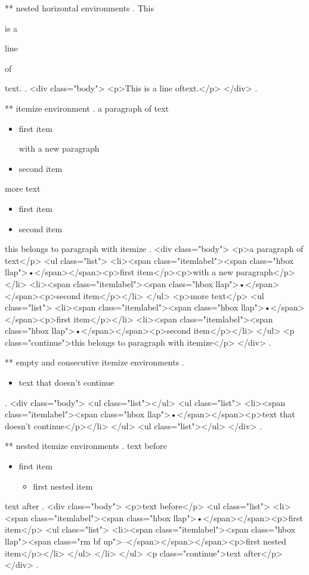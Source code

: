 ** nested horizontal environments
.
This \begin{empty}is a \begin{empty}line\end{empty} of\end{empty} text.
.
<div class="body">
<p>This is a line​ of​ text.</p>
</div>
.



** itemize environment
.
a paragraph of text

\begin{itemize}
    \item first item

        with a new paragraph
    \item second item
\end{itemize}
%

more text

\begin{itemize}
    \item first item
    \item second item

\end{itemize}
this belongs to paragraph with itemize
.
<div class="body">
<p>a paragraph of text</p>
<ul class="list">
<li><span class="itemlabel"><span class="hbox llap">•</span></span><p>ﬁrst item</p><p>with a new paragraph</p></li>
<li><span class="itemlabel"><span class="hbox llap">•</span></span><p>second item</p></li>
</ul>
<p>more text</p>
<ul class="list">
<li><span class="itemlabel"><span class="hbox llap">•</span></span><p>ﬁrst item</p></li>
<li><span class="itemlabel"><span class="hbox llap">•</span></span><p>second item</p></li>
</ul>
<p class="continue">this belongs to paragraph with itemize</p>
</div>
.


** empty and consecutive itemize environments
.
\begin{itemize}

\end{itemize}
\begin{itemize}
    \item text that doesn't continue
\end{itemize}
\begin{itemize}
\end{itemize}
.
<div class="body">
<ul class="list"></ul>
<ul class="list">
<li><span class="itemlabel"><span class="hbox llap">•</span></span><p>text that doesn’t continue</p></li>
</ul>
<ul class="list"></ul>
</div>
.


** nested itemize environments
.
text before
\begin{itemize}
    \item first item
        \begin{itemize}
            \item first nested item
        \end{itemize}
\end{itemize}
text after
.
<div class="body">
<p>text before</p>
<ul class="list">
<li><span class="itemlabel"><span class="hbox llap">•</span></span><p>ﬁrst item</p>
<ul class="list">
<li><span class="itemlabel"><span class="hbox llap"><span class="rm bf up">–</span></span></span><p>ﬁrst nested item</p></li>
</ul>
</li>
</ul>
<p class="continue">text after</p>
</div>
.



